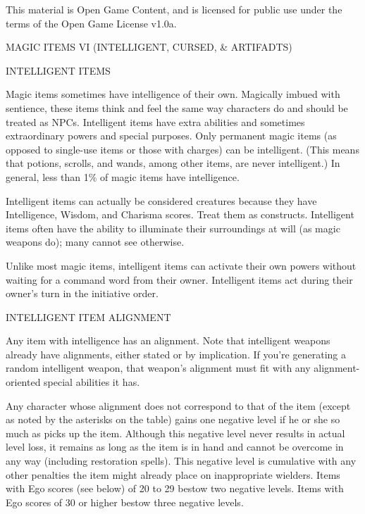 This material is Open Game Content, and is licensed for public use under the terms of the Open Game License v1.0a.

MAGIC ITEMS VI (INTELLIGENT, CURSED, & ARTIFADTS)



INTELLIGENT ITEMS

Magic items sometimes have intelligence of their own. Magically imbued with sentience, these items think and feel the same way characters do and should be treated as NPCs. Intelligent items have extra abilities and sometimes extraordinary powers and special purposes. Only permanent magic items (as opposed to single-use items or those with charges) can be intelligent. (This means that potions, scrolls, and wands, among other items, are never intelligent.) In general, less than 1\% of magic items have intelligence.

Intelligent items can actually be considered creatures because they have Intelligence, Wisdom, and Charisma scores. Treat them as constructs. Intelligent items often have the ability to illuminate their surroundings at will (as magic weapons do); many cannot see otherwise.

Unlike most magic items, intelligent items can activate their own powers without waiting for a command word from their owner. Intelligent items act during their owner's turn in the initiative order.



INTELLIGENT ITEM ALIGNMENT

Any item with intelligence has an alignment. Note that intelligent weapons already have alignments, either stated or by implication.  If you're generating a random intelligent weapon, that weapon's alignment must fit with any alignment-oriented special abilities it has.

Any character whose alignment does not correspond to that of the item (except as noted by the asterisks on the table) gains one negative level if he or she so much as picks up the item. Although this negative level never results in actual level loss, it remains as long as the item is in hand and cannot be overcome in any way (including restoration spells). This negative level is cumulative with any other penalties the item might already place on inappropriate wielders. Items with Ego scores (see below) of 20 to 29 bestow two negative levels. Items with Ego scores of 30 or higher bestow three negative levels.

 

